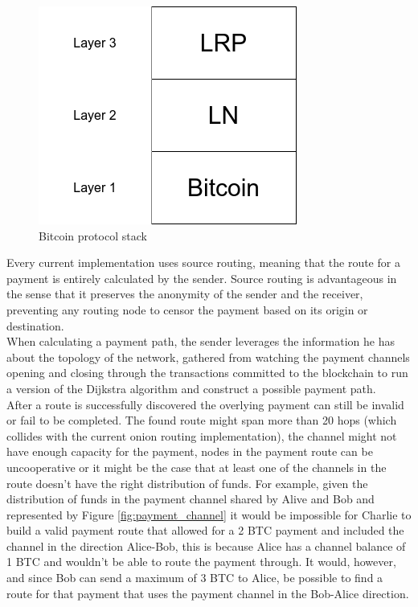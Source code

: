 \begin{figure}[H]
\begin{center}
  \includegraphics[width=0.5\linewidth]{images/protocol_stack.png}
  \caption{Bitcoin protocol stack}
  \label{fig:bitcoin_protocol_stack}
  \end{center}
\end{figure}

Every current implementation uses source routing, meaning that the route for a payment is entirely calculated by the sender. Source routing is advantageous in the sense that it preserves the anonymity of the sender and the receiver, preventing any routing node to censor the payment based on its origin or destination.\\
When calculating a payment path, the sender leverages the information he has about the topology of the network, gathered from watching the payment channels opening and closing through the transactions committed to the blockchain to run a version of the Dijkstra algorithm and construct a possible payment path. \\
After a route is successfully discovered the overlying payment can still be invalid or fail to be completed. The found route might span more than 20 hops (which collides with the current onion routing implementation), the channel might not have enough capacity for the payment, nodes in the payment route can be uncooperative or it might be the case that at least one of the channels in the route doesn't have the right distribution of funds. For example, given the distribution of funds in the payment channel shared by Alive and Bob and represented by Figure \ref{fig:payment_channel} it would be impossible for Charlie to build a valid payment route that allowed for a 2 BTC payment and included the channel in the direction Alice-Bob, this is because Alice has a channel balance of 1 BTC and wouldn't be able to route the payment through. It would, however, and since Bob can send a maximum of 3 BTC to Alice, be possible to find a route for that payment that uses the payment channel in the Bob-Alice direction. 

